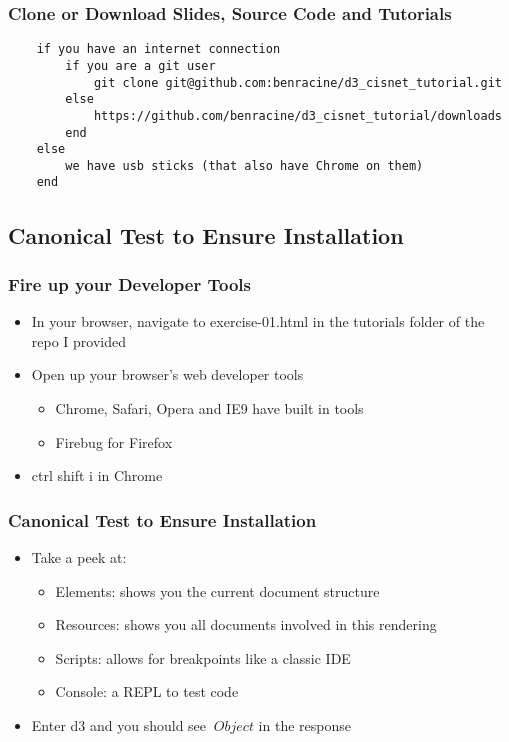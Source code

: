 \documentclass{beamer}
\begin{document}
\begin{frame}[fragile]
    \frametitle{Clone or Download Slides, Source Code and Tutorials}
        \tiny{
        \begin{verbatim}
    if you have an internet connection
        if you are a git user
            git clone git@github.com:benracine/d3_cisnet_tutorial.git
        else
            https://github.com/benracine/d3_cisnet_tutorial/downloads
        end
    else
        we have usb sticks (that also have Chrome on them)
    end
        \end{verbatim}
        }
\end{frame}



\subsection{Canonical Test to Ensure Installation}

\begin{frame}
    \frametitle{Fire up your Developer Tools}
    \begin{itemize}
\pause
    \item In your browser, navigate to exercise-01.html in the tutorials folder of the repo I provided
\pause
    \item Open up your browser's web developer tools
        \begin{itemize}
        \item Chrome, Safari, Opera and IE9 have built in tools
        \item Firebug for Firefox
        \end{itemize}
\pause
    \item ctrl shift i in Chrome
    \end{itemize}
\end{frame}


\begin{frame}
    \frametitle{Canonical Test to Ensure Installation}
    \begin{itemize}
\pause
    \item Take a peek at:
        \begin{itemize}
        \item Elements: shows you the current document structure
\pause
        \item Resources: shows you all documents involved in this rendering
\pause
        \item Scripts: allows for breakpoints like a classic IDE
\pause
        \item Console: a REPL to test code
\pause
        \end{itemize}
    \item Enter d3 and you should see $\> Object $ in the response
    \end{itemize}
\end{frame}
\end{document}
